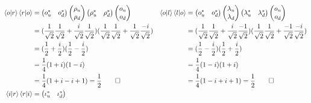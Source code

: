 \documentclass[solutions.tex]{subfiles}
\begin{document}
\begin{align*}
\braket{o}{r}\braket{r}{o} &=
\begin{pmatrix}
	\omicron_u^* & \omicron_d^* \\
\end{pmatrix}
\begin{pmatrix}
	\rho_u \\
	\rho_d \\
\end{pmatrix}
\begin{pmatrix}
	\rho_u^* & \rho_d^* \\
\end{pmatrix}
\begin{pmatrix}
	\omicron_u \\
	\omicron_d \\
\end{pmatrix} &
\braket{o}{l}\braket{l}{o} &=
\begin{pmatrix}
	\omicron_u^* & \omicron_d^* \\
\end{pmatrix}
\begin{pmatrix}
	\lambda_u \\
	\lambda_d \\
\end{pmatrix}
\begin{pmatrix}
	\lambda_u^* & \lambda_d^* \\
\end{pmatrix}
\begin{pmatrix}
	\omicron_u \\
	\omicron_d \\
\end{pmatrix} \\
~ &= (\frac1{\sqrt2}\frac1{\sqrt2}+\frac{i}{\sqrt2}\frac{1}{\sqrt2})
(\frac1{\sqrt2}\frac1{\sqrt2}+\frac{1}{\sqrt2}\frac{-i}{\sqrt2})
& ~ &= (\frac1{\sqrt2}\frac1{\sqrt2}+\frac{i}{\sqrt2}\frac{-1}{\sqrt2})
(\frac1{\sqrt2}\frac1{\sqrt2}+\frac{-1}{\sqrt2}\frac{-i}{\sqrt2}) \\
~ &= (\frac1{2}+\frac{i}{2})(\frac1{2}-\frac{i}{2})
& ~ &= (\frac1{2}-\frac{i}{2})(\frac1{2}+\frac{i}{2}) \\
~ &= \frac1{4}(1+i)(1-i)
& ~ &= \frac1{4}(1-i)(1+i) \\
~ &= \frac1{4}(1+i-i+1) = \frac1{2}\qed
& ~ &= \frac1{4}(1-i+i+1) = \frac1{2}\qed \\
\braket{i}{r}\braket{r}{i} &=
\begin{pmatrix}
	\iota_u^* & \iota_d^* \\
\end{pmatrix}

\end{align*}
\end{document}
